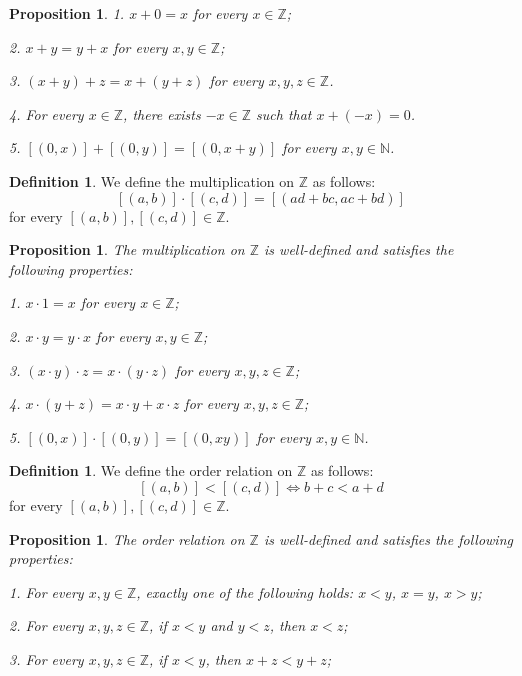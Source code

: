 \documentclass[12pt, reqno]{amsart}
\newtheorem{proposition}[theorem]{Proposition}
\theoremstyle{definition}
\newtheorem{definition}[theorem]{Definition}
\theoremstyle{remark}
\numberwithin{equation}{section}
\begin{document}
{\begin{proposition}
    1. $x + 0 = x$ for every $x\in \mathbb{Z}$;

    2. $x + y = y + x$ for every $x, y \in \mathbb{Z}$;

    3. $(x + y) + z = x + (y + z)$ for every $x, y, z \in \mathbb{Z}$.

    4. For every $x\in \mathbb{Z}$, there exists $-x \in \mathbb{Z}$ such that $x + (-x) = 0$.
    
    5. $[(0, x)] + [(0,y)] = [(0, x + y)]$ for every $x, y \in \mathbb{N}$.
\end{proposition}

\begin{definition}
    We define the multiplication on $\mathbb{Z}$ as follows:
    \[
        [(a, b)] \cdot [(c, d)] = [(ad + bc, ac + bd)]
    \]
    for every $[(a, b)], [(c, d)] \in \mathbb{Z}$.
\end{definition}

\begin{proposition}
    The multiplication on $\mathbb{Z}$ is well-defined and satisfies the following properties:

    1. $x \cdot 1 = x$ for every $x\in \mathbb{Z}$;

    2. $x \cdot y = y \cdot x$ for every $x, y \in \mathbb{Z}$;

    3. $(x \cdot y) \cdot z = x \cdot (y \cdot z)$ for every $x, y, z \in \mathbb{Z}$;

    4. $x \cdot (y + z) = x \cdot y + x \cdot z$ for every $x, y, z \in \mathbb{Z}$;

    5. $[(0, x)] \cdot [(0,y)] = [(0, xy)]$ for every $x, y \in \mathbb{N}$.
\end{proposition}

\begin{definition}
    We define the order relation on $\mathbb{Z}$ as follows:
    \[
        [(a, b)] < [(c, d)] \iff b + c < a + d
    \]
    for every $[(a, b)], [(c, d)] \in \mathbb{Z}$.
\end{definition}

\begin{proposition}
    The order relation on $\mathbb{Z}$ is well-defined and satisfies the following properties:

    1. For every $x, y \in \mathbb{Z}$, exactly one of the following holds: $x < y$, $x = y$, $x > y$;

    2. For every $x, y, z \in \mathbb{Z}$, if $x < y$ and $y < z$, then $x < z$;

    3. For every $x, y, z \in \mathbb{Z}$, if $x < y$, then $x + z < y + z$;


\end{proposition}}
\end{document}
